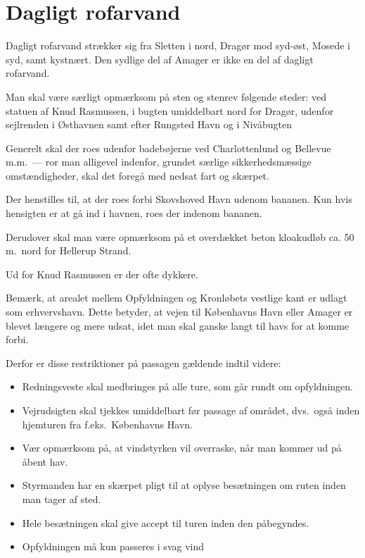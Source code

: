 \documentclass{article}
\begin{document}
\section{Dagligt rofarvand}

Dagligt rofarvand strækker sig fra Sletten i nord, Dragør mod syd-øst,
Mosede i syd, samt kystnært. Den sydlige del af Amager er ikke en del af
dagligt rofarvand.

Man skal være særligt opmærksom på sten og stenrev følgende steder: ved
statuen af Knud Rasmussen, i bugten umiddelbart nord for Dragør, udenfor
sejlrenden i Østhavnen samt efter Rungsted Havn og i Nivåbugten

Generelt skal der roes udenfor badebøjerne ved Charlottenlund og Bellevue
m.m.\ --- ror man alligevel indenfor, grundet særlige sikkerhedsmæssige
omstændigheder, skal det foregå med nedsat fart og skærpet.

Der henstilles til, at der roes forbi Skovshoved Havn udenom bananen. Kun
hvis hensigten er at gå ind i havnen, roes der indenom bananen.

Derudover skal man være opmærksom på et overdækket beton kloakudløb ca.
50 m.\ nord for Hellerup Strand.

Ud for Knud Rasmussen er der ofte dykkere.

Bemærk, at arealet mellem Opfyldningen og Kronløbets vestlige kant er
udlagt som erhvervshavn.  Dette betyder, at vejen til Københavns Havn
eller Amager er blevet længere og mere udsat, idet man skal ganske langt
til havs for at komme forbi.

Derfor er disse restriktioner på passagen gældende indtil videre:

\begin{itemize}
    \item Redningsveste skal medbringes på alle ture, som går
        rundt om opfyldningen.

    \item Vejrudsigten skal tjekkes umiddelbart før passage af området,
        dvs.\ også inden hjemturen fra f.eks.\ Københavns Havn.

    \item Vær opmærksom på, at vindstyrken vil overraske, når man kommer
        ud på åbent hav.

    \item Styrmanden har en skærpet pligt til at oplyse besætningen om
        ruten inden man tager af sted.

    \item Hele besætningen skal give accept til turen inden den
        påbegyndes.

    \item Opfyldningen må kun passeres i svag vind
\end{itemize}
\end{document}
